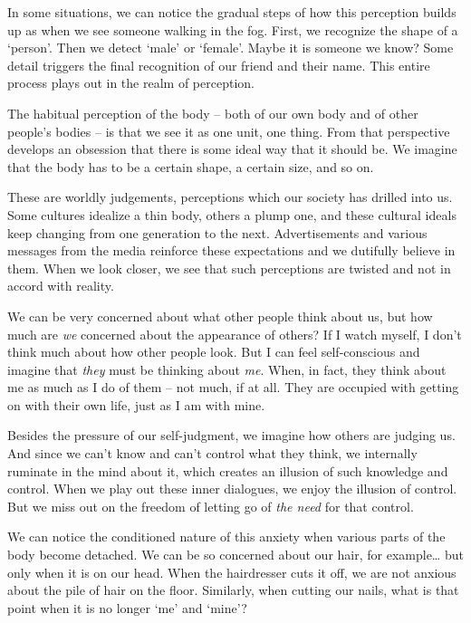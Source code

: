 \vfill\null
\clearpage
\normalpagelayout

In some situations, we can notice the gradual steps of how this
perception builds up as when we see someone walking in the fog. First,
we recognize the shape of a `person'. Then we detect `male' or `female'.
Maybe it is someone we know? Some detail triggers the final recognition
of our friend and their name. This entire process plays out in the realm
of perception.

The habitual perception of the body -- both of our own body and of other
people's bodies -- is that we see it as one unit, one thing. From that
perspective develops an obsession that there is some ideal way that it
should be. We imagine that the body has to be a certain shape, a certain
size, and so on.

These are worldly judgements, perceptions which our society has drilled
into us. Some cultures idealize a thin body, others a plump one, and
these cultural ideals keep changing from one generation to the next.
Advertisements and various messages from the media reinforce these
expectations and we dutifully believe in them. When we look closer, we
see that such perceptions are twisted and not in accord with reality.

We can be very concerned about what other people think about us, but how
much are \emph{we} concerned about the appearance of others? If I watch
myself, I don't think much about how other people look. But I can feel
self-conscious and imagine that \emph{they} must be thinking about
\emph{me}. When, in fact, they think about me as much as I do of them --
not much, if at all. They are occupied with getting on with their own
life, just as I am with mine.

Besides the pressure of our self-judgment, we imagine how others are
judging us. And since we can't know and can't control what they think,
we internally ruminate in the mind about it, which creates an illusion
of such knowledge and control. When we play out these inner dialogues,
we enjoy the illusion of control. But we miss out on the freedom of
letting go of \emph{the need} for that control.


We can notice the conditioned nature of this anxiety when various parts
of the body become detached. We can be so concerned about our hair, for
example\ldots{} but only when it is on our head. When the hairdresser
cuts it off, we are not anxious about the pile of hair on the floor.
Similarly, when cutting our nails, what is that point when it is no
longer `me' and `mine'?

